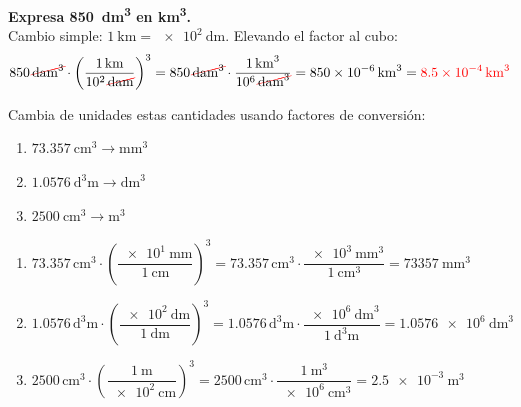 \begin{example}
    \textbf{Expresa \qty{850}{\cubic\deca\metre} en \unit{\cubic\km}.} \\
    Cambio simple: \(\qty{1}{\km} = \qty{e2}{\deca\m}\). Elevando el factor al cubo:
    \begin{equation*}
        \num{850}\,\cancelunit{\cubic\deca\m} \cdot \left(\dfrac{\qty{1}{\km}}{\num{e2}\,\cancelunit{\deca\m}}\right)^{3}
        = \num{850}\,\cancelunit{\cubic\deca\m} \cdot \dfrac{\qty{1}{\cubic\km}}{\num{e6}\,\cancelunit{\cubic\deca\m}}
        = \qty{850e-6}{\cubic\km} = \textcolor{red}{\qty{8.5e-4}{\cubic\km}}
    \end{equation*}
\end{example}

\begin{exercise}
    Cambia de unidades estas cantidades usando factores de conversión:
    \begin{enumerate}[label=\letraminuscula]
        \item \(\qty{73.357}{\cubic\cm} \to \unit{\cubic\mm}\)
        \item \(\qty{1.0576}{\cubic\deca\metre} \to \unit{\cubic\dm}\)
        \item \(\qty{2500}{\cubic\cm} \to \unit{\cubic\m}\)
    \end{enumerate}
    \begin{solu}
        \begin{enumerate}[label=\alph*)]
            \item \(\num{73.357}\,\unit{\cubic\cm} \cdot \left(\dfrac{\qty{e1}{\mm}}{\qty{1}{\cm}}\right)^{3} = \num{73.357}\,\unit{\cubic\cm} \cdot \dfrac{\qty{e3}{\cubic\mm}}{\qty{1}{\cubic\cm}} = \qty{73357}{\cubic\mm}\)
            \item \(\num{1.0576}\,\unit{\cubic\deca\m} \cdot \left(\dfrac{\qty{e2}{\dm}}{\qty{1}{\deca\m}}\right)^{3} = \num{1.0576}\,\unit{\cubic\deca\m} \cdot \dfrac{\qty{e6}{\cubic\dm}}{\qty{1}{\cubic\deca\m}} = \qty{1.0576e6}{\cubic\dm}\)
            \item \(\num{2500}\,\unit{\cubic\cm} \cdot \left(\dfrac{\qty{1}{\m}}{\qty{e2}{\cm}}\right)^{3} = \num{2500}\,\unit{\cubic\cm} \cdot \dfrac{\qty{1}{\cubic\m}}{\qty{e6}{\cubic\cm}} = \qty{2.5e-3}{\cubic\m}\)
        \end{enumerate}
    \end{solu}
\end{exercise}

